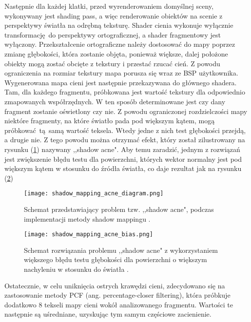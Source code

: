 Następnie dla każdej klatki, przed wyrenderowaniem domyślnej sceny, wykonywany jest shading pass, a więc renderowanie obiektów na scenie z perspektywy światła na odrębną teksturę. Shader cienia wykonuje wyłącznie transformację do perspektywy ortograficznej, a shader fragmentowy jest wyłączony. Przekształcenie ortograficzne należy dostosować do mapy poprzez zmianę głębokości, która zostanie objęta, ponieważ większe, dalej położone obiekty mogą zostać obcięte z tekstury i przestać rzucać cień. Z powodu ograniczenia na rozmiar tekstury mapa porusza się wraz ze BSP użytkownika. 
\\

Wygenerowana mapa cieni jest następnie przekazywana do głównego shadera. Tam, dla każdego fragmentu, próbkowana jest wartość tekstury dla odpowiednio zmapowanych współrzędnych. W ten sposób determinowane jest czy dany fragment zostanie oświetlony czy nie. Z powodu ograniczonej rozdzielczości mapy niektóre fragmenty, na które światło pada pod większym kątem, mogą próbkować tą samą wartość teksela. Wtedy jedne z nich test głębokości przejdą, a drugie nie. Z tego powodu można otrzymać efekt, który został zilustrowany na rysunku (\ref{shadow_mapping_acne_diagram}) nazywany ,,shadow acne". Aby temu zaradzić, jednym z rozwiązań jest zwiększenie błędu testu dla powierzchni, których wektor normalny jest pod większym kątem w stosunku do źródła światła, co daje rezultat jak na rysunku (\ref{shadow_mapping_acne_bias})
\\

\begin{figure}[h]
	\centering
	\texttt{[image: shadow\_mapping\_acne\_diagram.png]}
	\caption{Schemat przedstawiający problem tzw. ,,shadow acne", podczas implementacji metody shadow mappingu \cite{learnopengl}.}
	\label{shadow_mapping_acne_diagram}
\end{figure}

\begin{figure}[h]
\centering
\texttt{[image: shadow\_mapping\_acne\_bias.png]}
\caption{Schemat rozwiązania problemu ,,shadow acne" z wykorzystaniem większego błędu testu głębokości dla powierzchni o większym nachyleniu w stosunku do światła \cite{learnopengl}.}
\label{shadow_mapping_acne_bias}
\end{figure}

Ostatecznie, w celu uniknięcia ostrych krawędzi cieni, zdecydowano się na zastosowanie metody PCF (ang. percentage-closer filtering), która próbkuje dodatkowo 8 tekseli mapy cieni wokół analizowanego fragmentu. Wartości te następnie są uśredniane, uzyskując tym samym częściowe zacienienie.

